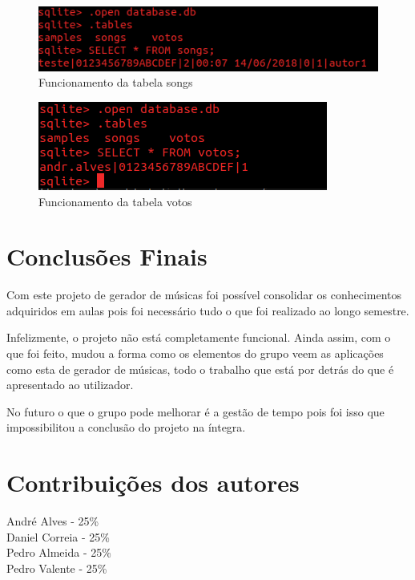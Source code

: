 \documentclass{report}
\begin{document}
\begin{figure} [h]
	\centering
	\includegraphics [scale = 0.5] {img/songs}
	\caption{Funcionamento da tabela songs}
\end{figure}

\begin{figure} [h]
	\centering
	\includegraphics [scale = 0.5] {img/votos}
	\caption{Funcionamento da tabela votos}
\end{figure}

	 
\chapter{Conclusões Finais}
\label{chap.conclusao}
	Com este projeto de gerador de músicas foi possível consolidar os conhecimentos adquiridos em aulas pois foi necessário tudo o que foi realizado ao longo semestre. 
	
	Infelizmente, o projeto não está completamente funcional. Ainda assim, com o que foi feito, mudou a forma como os elementos do grupo veem as aplicações como esta de gerador de músicas, todo o trabalho que está por detrás do que é apresentado ao utilizador.  
	
	No futuro o que o grupo pode melhorar é a gestão de tempo pois foi isso que impossibilitou a conclusão do projeto na íntegra.


\chapter{Contribuições dos autores}
\label{contribuições}

\noindent
André Alves - 25\% \\
Daniel Correia - 25\% \\
Pedro Almeida - 25\% \\
Pedro Valente - 25\% 
\end{document}
